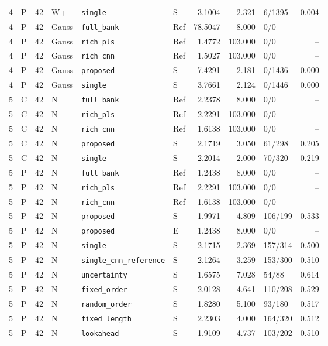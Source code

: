 \documentclass[10pt,a4paper]{article}
\begin{document}
\begin{landscape}
\begin{longtable}{rlrlllrrlr}
4 & P & 42 & W+ & \texttt{single} & S & 3.1004 & 2.321 & 6/1395 & 0.004 \\
4 & P & 42 & Gauss & \texttt{full\_bank} & Ref & 78.5047 & 8.000 & 0/0 & -- \\
4 & P & 42 & Gauss & \texttt{rich\_pls} & Ref & 1.4772 & 103.000 & 0/0 & -- \\
4 & P & 42 & Gauss & \texttt{rich\_cnn} & Ref & 1.5027 & 103.000 & 0/0 & -- \\
4 & P & 42 & Gauss & \texttt{proposed} & S & 7.4291 & 2.181 & 0/1436 & 0.000 \\
4 & P & 42 & Gauss & \texttt{single} & S & 3.7661 & 2.124 & 0/1446 & 0.000 \\
5 & C & 42 & N & \texttt{full\_bank} & Ref & 2.2378 & 8.000 & 0/0 & -- \\
5 & C & 42 & N & \texttt{rich\_pls} & Ref & 2.2291 & 103.000 & 0/0 & -- \\
5 & C & 42 & N & \texttt{rich\_cnn} & Ref & 1.6138 & 103.000 & 0/0 & -- \\
5 & C & 42 & N & \texttt{proposed} & S & 2.1719 & 3.050 & 61/298 & 0.205 \\
5 & C & 42 & N & \texttt{single} & S & 2.2014 & 2.000 & 70/320 & 0.219 \\
5 & P & 42 & N & \texttt{full\_bank} & Ref & 1.2438 & 8.000 & 0/0 & -- \\
5 & P & 42 & N & \texttt{rich\_pls} & Ref & 2.2291 & 103.000 & 0/0 & -- \\
5 & P & 42 & N & \texttt{rich\_cnn} & Ref & 1.6138 & 103.000 & 0/0 & -- \\
5 & P & 42 & N & \texttt{proposed} & S & 1.9971 & 4.809 & 106/199 & 0.533 \\
5 & P & 42 & N & \texttt{proposed} & E & 1.2438 & 8.000 & 0/0 & -- \\
5 & P & 42 & N & \texttt{single} & S & 2.1715 & 2.369 & 157/314 & 0.500 \\
5 & P & 42 & N & \texttt{single\_cnn\_reference} & S & 2.1264 & 3.259 & 153/300 & 0.510 \\
5 & P & 42 & N & \texttt{uncertainty} & S & 1.6575 & 7.028 & 54/88 & 0.614 \\
5 & P & 42 & N & \texttt{fixed\_order} & S & 2.0128 & 4.641 & 110/208 & 0.529 \\
5 & P & 42 & N & \texttt{random\_order} & S & 1.8280 & 5.100 & 93/180 & 0.517 \\
5 & P & 42 & N & \texttt{fixed\_length} & S & 2.2303 & 4.000 & 164/320 & 0.512 \\
5 & P & 42 & N & \texttt{lookahead} & S & 1.9109 & 4.737 & 103/202 & 0.510 \\

\end{longtable}
\end{landscape}
\end{document}
